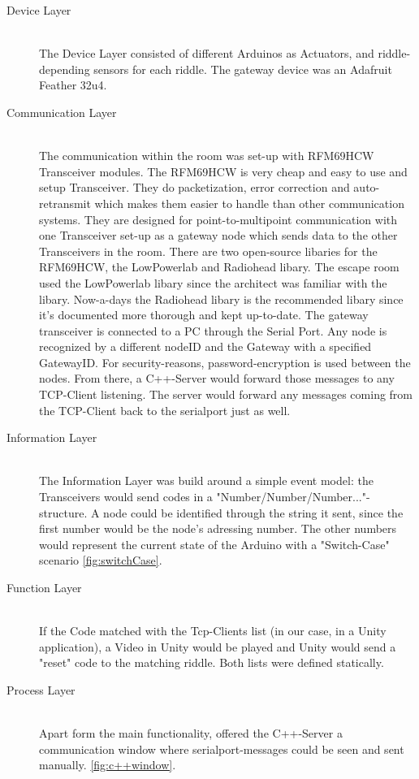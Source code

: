 \begin{description}
	\item[Device Layer]\hfill \\
	      The Device Layer consisted of different Arduinos as Actuators, and riddle-depending sensors for each riddle.
	      The gateway device was an Adafruit Feather 32u4.
	\item[Communication Layer]\hfill \\
	      The communication within the room was set-up with RFM69HCW Transceiver modules.\parencite{radiorange}
	      The RFM69HCW is very cheap and easy to use and setup Transceiver. They do packetization, error correction and auto-retransmit which makes them easier to handle than other communication systems.
	      They are designed for point-to-multipoint communication with one Transceiver set-up as a gateway node which sends data to the other Transceivers in the room.
	      There are two open-source libaries for the RFM69HCW, the LowPowerlab \parencite{LowPowerlab} and Radiohead \parencite{Radiohead} libary.
	      The escape room used the LowPowerlab libary since the architect was familiar with the libary.
          Now-a-days the Radiohead libary is the recommended libary since it's documented more thorough and kept up-to-date.
          The gateway transceiver is connected to a PC through the Serial Port. Any node is recognized by a different nodeID and the Gateway with a specified GatewayID. For security-reasons, password-encryption is used between the nodes. 
          From there, a C++-Server would forward those messages to any TCP-Client listening.    
          The server would forward any messages coming from the TCP-Client back to the serialport just as well.
	\item[Information Layer]\hfill \\
        The Information Layer was build around a simple event model: the Transceivers would send codes in a "Number/Number/Number..."-structure. 
        A node could be identified through the string it sent, since the first number would be the node's adressing number. 
        The other numbers would represent the current state of the Arduino with a "Switch-Case" scenario \ref{fig:switchCase}. 
	\item[Function Layer]\hfill \\
        If the Code matched with the Tcp-Clients list (in our case, in a Unity application), a Video in Unity would be played and Unity would send a "reset" code to the matching riddle. 
        Both lists were defined statically.
	\item[Process Layer]\hfill \\
	Apart form the main functionality, offered the C++-Server a communication window where serialport-messages 
    could be seen and sent manually. \ref{fig:c++window}.

\end{description}
